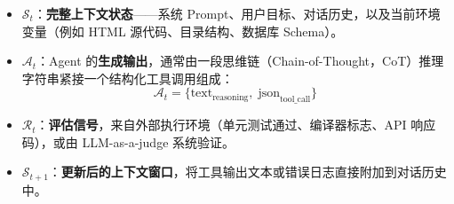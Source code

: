 \begin{itemize}
  \item $\mathcal{S}_t$：\textbf{完整上下文状态}——系统 Prompt、用户目标、对话历史，以及当前环境变量（例如 HTML 源代码、目录结构、数据库 Schema）。
  \item $\mathcal{A}_t$：Agent 的\textbf{生成输出}，通常由一段思维链（Chain-of-Thought，CoT）推理字符串紧接一个结构化工具调用组成：
\begin{equation}
\mathcal{A}_t = \{\text{text}_{\text{reasoning}},\; \text{json}_{\text{tool\_call}}\}
\end{equation}
  \item $\mathcal{R}_t$：\textbf{评估信号}，来自外部执行环境（单元测试通过、编译器标志、API 响应码），或由 LLM-as-a-judge 系统验证。
  \item $\mathcal{S}_{t+1}$：\textbf{更新后的上下文窗口}，将工具输出文本或错误日志直接附加到对话历史中。
\end{itemize}

